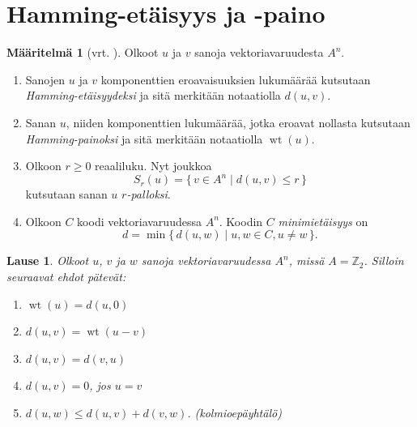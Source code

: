 \documentclass[a4paper,12pt,leqno,oneside]{report} %
\theoremstyle{plain}
\newtheorem{lause}{Lause}[chapter]
\theoremstyle{plain}
\theoremstyle{definition}
\newtheorem{maaritelma}{Määritelmä}[chapter]
\DeclareMathOperator{\wt}{wt}
\theoremstyle{remark}
\numberwithin{equation}{chapter}
\newcommand*{\Zset}{\mathbb{Z}}  %
\begin{document}

    \section{Hamming-etäisyys ja -paino}
    \begin{maaritelma}[vrt. {\cite[s.~492]{PA}}]\label{maar:perus}
        Olkoot $u$ ja $v$ sanoja vektoriavaruudesta $A^n$.
        \begin{enumerate}
            \item\label{kht:etaisyys} Sanojen $u$ ja $v$ komponenttien eroavaisuuksien lukumäärää kutsutaan \break{} \emph{Hamming-etäisyydeksi} ja sitä merkitään notaatiolla $d(u,v)$.
            \item\label{kht:paino} Sanan $u$, niiden komponenttien lukumäärää, jotka eroavat nollasta kutsutaan \emph{Hamming-painoksi} ja sitä merkitään notaatiolla
                $\wt(u)$.
            \item Olkoon $r\ge0$ reaaliluku. Nyt joukkoa
                \[
                    S_r(u) = \{\,v \in A^n \mid d(u, v) \le r \,\}
                \]
                kutsutaan sanan $u$ \emph{$r$-palloksi}.
            \item Olkoon $C$ koodi vektoriavaruudessa $A^n$. Koodin $C$ \emph{minimietäisyys} on
                \[
                    d = \min\{\, d(u, w) \mid u, w \in C, u \neq w \,\}.
                \]
        \end{enumerate}
    \end{maaritelma}

    \begin{lause}\label{lause:Hamming}
        Olkoot $u$, $v$ ja $w$ sanoja vektoriavaruudessa $A^n$, missä $A = \Zset_2$. Silloin seuraavat ehdot pätevät:
        \begin{enumerate}
            \item\label{kht:painoetaisyys} $\wt(u) = d(u, 0)$
            \item\label{kht:etaisyyspaino} $d(u, v) = \wt(u - v)$
            \item\label{kht:vaihdannaisuus}$d(u, v) = d(v, u)$
            \item\label{kht:nollaetaisyys} $d(u, v) = 0$, jos $u = v$
            \item\label{kht:kolmioey} $d(u, w) \le d(u, v) + d(v, w)$. \quad (kolmioepäyhtälö)
        \end{enumerate}
    \end{lause}
\end{document}
